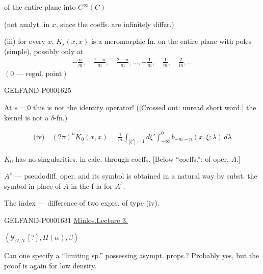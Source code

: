 of the entire plane into $C^\infty (C)$

(not analyt. in $x$, since the coeffs. are infinitely differ.)


(iii) for every $x$, $K_s (x, x)$ is a meromorphic fn. on the entire plane with poles (simple), possibly only at
\begin{gather*}
-\frac{n}{m},\quad\frac{1-n}{m},\quad\frac{2-n}{m},\ldots,
-\frac{1}{m},\quad\frac{1}{m},\quad\frac{2}{m},\ldots
\end{gather*}
$(0\text{ --- regul. point})$

\begin{GelfandAdjacentEvidence}{GELFAND-P000162}{5}

At $s=0$ this is not the identity operator! ([Crossed out: unread short word.] the kernel is not a $\delta$-fn.)
\end{GelfandAdjacentEvidence}


\begin{gather*}
\text{(iv)}\quad (2\pi)^nK_0(x, x)=\frac{1}{m}
\int_{|\xi'|=1}d\xi'\int_{-\infty}^{0}b_{-m-n}(x,\xi;\lambda)\, d\lambda
\end{gather*}


$K_0$ has no singularities. in calc. through coeffs. [Below ``coeffs.'': of oper. $A$.]


$A^s$ --- pseudodiff. oper. and its symbol is obtained in a natural way by subst. the symbol in place of $A$ in the f-la for $A^s$.

The index --- difference of two exprs. of type (iv).



\begin{GelfandAdjacentEvidence}{GELFAND-P000163}{1}
\underline{Minlos.}\qquad \underline{Lecture 3.}


$(\mathcal{Y}_{\Omega, N}\, [?], H (\alpha),\beta)$

\end{GelfandAdjacentEvidence}


Can one specify a ``limiting sp.'' possessing asympt. props.?
Probably yes, but the proof is again for low density.


